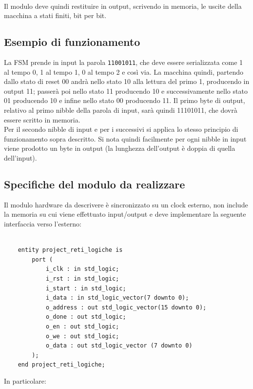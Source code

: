 \documentclass[12pt, a4paper]{article}
\begin{document}
\noindent \\ Il modulo deve quindi restituire in output, scrivendo in memoria, le uscite della macchina a stati finiti,
bit per bit. %

\subsection{Esempio di funzionamento}

La FSM prende in input la parola \verb+11001011+, che deve essere serializzata come
1 al tempo 0, 1 al tempo 1, 0 al tempo 2 e così via.
La macchina quindi, partendo dallo stato di reset 00 andrà nello stato 10 alla lettura
del primo 1, producendo in output 11; passerà poi nello stato 11 producendo 10 e successivamente nello stato 01
producendo 10 e infine nello stato 00 producendo 11.
Il primo byte di output, relativo al primo nibble della parola di input, sarà quindi 11101011, che dovrà essere scritto in memoria.\\
Per il secondo nibble di input e per i successivi si applica lo stesso principio di funzionamento sopra descritto.
Si nota quindi facilmente per ogni nibble in input viene prodotto un byte in output (la lunghezza dell'output è doppia di quella dell'input). 

\pagebreak

\subsection{Specifiche del modulo da realizzare}

Il modulo hardware da descrivere è sincronizzato su un clock esterno, non include la memoria su cui viene effettuato input/output e
deve implementare la seguente interfaccia verso l'esterno:

\begin{verbatim}
    
    entity project_reti_logiche is
        port (
            i_clk : in std_logic;
            i_rst : in std_logic;
            i_start : in std_logic;
            i_data : in std_logic_vector(7 downto 0);
            o_address : out std_logic_vector(15 downto 0);
            o_done : out std_logic;
            o_en : out std_logic;
            o_we : out std_logic;
            o_data : out std_logic_vector (7 downto 0)
        );
    end project_reti_logiche;

\end{verbatim}

\noindent In particolare:
\end{document}
